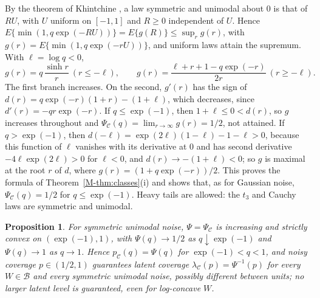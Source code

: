 \documentclass[12pt]{article}
\renewcommand{\_}{\usc\allowbreak}
\newtheorem{proposition}{Proposition}
\theoremstyle{definition}
\numberwithin{equation}{section}
\newcommand{\B}{\mathcal{B}}
\newcommand{\E}{\mathcal{C}}
\begin{document}
By the theorem of Khintchine \citep[Chapter~1]{dharmadhikari1988}, a law symmetric and unimodal about $0$ is that of $RU$, with $U$ uniform on $[-1, 1]$ and $R \ge 0$ independent of $U$. Hence $E\{\min(1, q\exp(-RU))\} = E\{g(R)\} \le \sup_r g(r)$, with $g(r) = E\{\min(1, q\exp(-rU))\}$, and uniform laws attain the supremum. With $\ell = \log q < 0$,
\[
g(r) = q\,\frac{\sinh r}{r}\ (r \le -\ell), \qquad g(r) = \frac{\ell + r + 1 - q\exp(-r)}{2r}\ (r \ge -\ell).
\]
The first branch increases. On the second, $g'(r)$ has the sign of $d(r) = q\exp(-r)(1 + r) - (1 + \ell)$, which decreases, since $d'(r) = -qr\exp(-r)$. If $q \le \exp(-1)$, then $1 + \ell \le 0 < d(r)$, so $g$ increases throughout and $\Psi_{\E}(q) = \lim_{r\to\infty} g(r) = 1/2$, not attained. If $q > \exp(-1)$, then $d(-\ell) = \exp(2\ell)(1 - \ell) - 1 - \ell > 0$, because this function of $\ell$ vanishes with its derivative at $0$ and has second derivative $-4\ell\exp(2\ell) > 0$ for $\ell < 0$, and $d(r) \to -(1 + \ell) < 0$; so $g$ is maximal at the root $r$ of $d$, where $g(r) = (1 + q\exp(-r))/2$. This proves the formula of Theorem~\ref{M-thm:classes}(i) and shows that, as for Gaussian noise, $\Psi_{\E}(q) = 1/2$ for $q \le \exp(-1)$. Heavy tails are allowed: the $t_3$ and Cauchy laws are symmetric and unimodal.

\begin{proposition}\label{prop:su-exact}
For symmetric unimodal noise, $\Psi = \Psi_{\E}$ is increasing and strictly convex on $(\exp(-1), 1)$, with $\Psi(q) \to 1/2$ as $q \downarrow \exp(-1)$ and $\Psi(q) \to 1$ as $q \to 1$. Hence $p_{\E}(q) = \Psi(q)$ for $\exp(-1) < q < 1$, and noisy coverage $p \in (1/2, 1)$ guarantees latent coverage $\lambda_{\E}(p) = \Psi^{-1}(p)$ for every $W \in \B$ and every symmetric unimodal noise, possibly different between units; no larger latent level is guaranteed, even for log-concave $W$.
\end{proposition}
\end{document}
